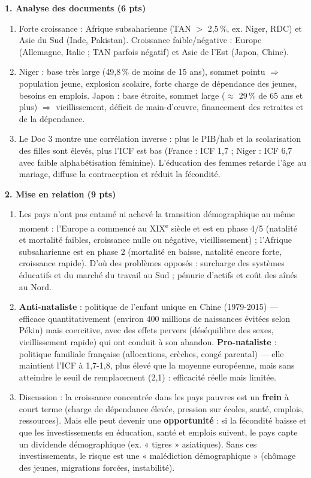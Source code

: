 \documentclass[11pt]{article}
\newcommand{\cle}[1]{{\popxbold\color{popdark}#1}}
\begin{document}
\begin{corrige}
\textbf{1. Analyse des documents (6 pts)}
\begin{enumerate}
    \item Forte croissance : Afrique subsaharienne (TAN $>$ 2,5\,\%, ex. Niger, RDC) et Asie du Sud (Inde, Pakistan). Croissance faible/négative : Europe (Allemagne, Italie ; TAN parfois négatif) et Asie de l'Est (Japon, Chine).
    \item Niger : base très large (49,8\,\% de moins de 15 ans), sommet pointu $\Rightarrow$ population jeune, explosion scolaire, forte charge de dépendance des jeunes, besoins en emplois. Japon : base étroite, sommet large ($\approx$ 29\,\% de 65 ans et plus) $\Rightarrow$ vieillissement, déficit de main-d'œuvre, financement des retraites et de la dépendance.
    \item Le Doc 3 montre une corrélation inverse : plus le PIB/hab et la scolarisation des filles sont élevés, plus l'ICF est bas (France : ICF 1,7 ; Niger : ICF 6,7 avec faible alphabétisation féminine). L'éducation des femmes retarde l'âge au mariage, diffuse la contraception et réduit la fécondité.
\end{enumerate}
\textbf{2. Mise en relation (9 pts)}
\begin{enumerate}
    \item Les pays n'ont pas entamé ni achevé la transition démographique au même moment : l'Europe a commencé au XIX\textsuperscript{e} siècle et est en phase 4/5 (natalité et mortalité faibles, croissance nulle ou négative, vieillissement) ; l'Afrique subsaharienne est en phase 2 (mortalité en baisse, natalité encore forte, croissance rapide). D'où des problèmes opposés : surcharge des systèmes éducatifs et du marché du travail au Sud ; pénurie d'actifs et coût des aînés au Nord.
    \item \textbf{Anti-nataliste} : politique de l'enfant unique en Chine (1979-2015) — efficace quantitativement (environ 400 millions de naissances évitées selon Pékin) mais coercitive, avec des effets pervers (déséquilibre des sexes, vieillissement rapide) qui ont conduit à son abandon. \textbf{Pro-nataliste} : politique familiale française (allocations, crèches, congé parental) — elle maintient l'ICF à 1,7-1,8, plus élevé que la moyenne européenne, mais sans atteindre le seuil de remplacement (2,1) : efficacité réelle mais limitée.
    \item Discussion : la croissance concentrée dans les pays pauvres est un \textbf{frein} à court terme (charge de dépendance élevée, pression sur écoles, santé, emplois, ressources). Mais elle peut devenir une \textbf{opportunité} : si la fécondité baisse et que les investissements en éducation, santé et emplois suivent, le pays capte un \cle{dividende démographique} (ex. « tigres » asiatiques). Sans ces investissements, le risque est une « malédiction démographique » (chômage des jeunes, migrations forcées, instabilité).

\end{enumerate}
\end{corrige}
\end{document}

